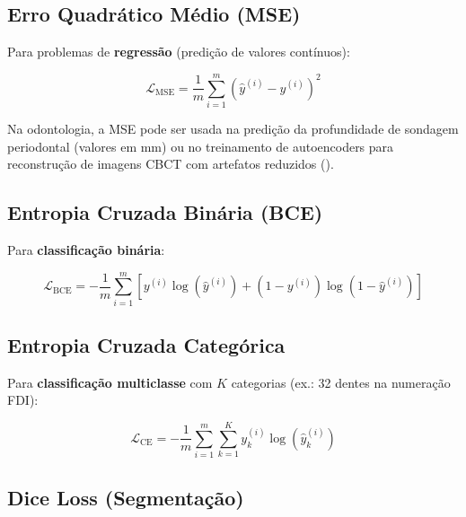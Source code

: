 \subsection{Erro Quadrático Médio (MSE)}

Para problemas de \textbf{regressão} (predição de valores contínuos):

\begin{equation}
  \mathcal{L}_{\text{MSE}} = \frac{1}{m} \sum_{i=1}^{m} (\hat{y}^{(i)} - y^{(i)})^2
  \label{eq:mse}
\end{equation}

Na odontologia, a MSE pode ser usada na predição da profundidade de sondagem
periodontal (valores em mm) ou no treinamento de autoencoders para reconstrução
de imagens CBCT com artefatos reduzidos ().

\subsection{Entropia Cruzada Binária (BCE)}

Para \textbf{classificação binária}:

\begin{equation}
  \mathcal{L}_{\text{BCE}} = -\frac{1}{m} \sum_{i=1}^{m} \left[
    y^{(i)} \log(\hat{y}^{(i)}) + (1 - y^{(i)}) \log(1 - \hat{y}^{(i)})
  \right]
  \label{eq:bce}
\end{equation}


\subsection{Entropia Cruzada Categórica}

Para \textbf{classificação multiclasse} com $K$ categorias (ex.: 32 dentes na
numeração FDI):

\begin{equation}
  \mathcal{L}_{\text{CE}} = -\frac{1}{m} \sum_{i=1}^{m} \sum_{k=1}^{K}
    y_k^{(i)} \log(\hat{y}_k^{(i)})
  \label{eq:ce}
\end{equation}

\subsection{Dice Loss (Segmentação)}

